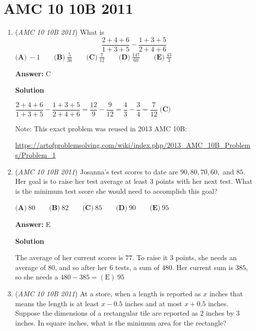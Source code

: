 \section{AMC 10 10B 2011}
        \begin{enumerate}
        	\item (\textit{AMC 10 10B 2011}) What is 
 \[\dfrac{2+4+6}{1+3+5} - \dfrac{1+3+5}{2+4+6}\]
$\textbf{(A)}\ -1\qquad\textbf{(B)}\ \frac{5}{36}\qquad\textbf{(C)}\ \frac{7}{12}\qquad\textbf{(D)}\ \frac{147}{60}\qquad\textbf{(E)}\ \frac{43}{3}$

 \textbf{Answer: }C



\textbf{Solution}

$\dfrac{2+4+6}{1+3+5} - \dfrac{1+3+5}{2+4+6} = \dfrac{12}{9} - \dfrac{9}{12} = \dfrac{4}{3} - \dfrac{3}{4} = \boxed{\dfrac{7}{12}\; \textbf{(C)}}$

 
Note: This exact problem was reused in 2013 AMC 10B: 

 \href{https://artofproblemsolving.com/wiki/index.php/2013\_AMC\_10B\_Problems/Problem\_1}{https://artofproblemsolving.com/wiki/index.php/2013\_AMC\_10B\_Problems/Problem\_1}

 


	\item (\textit{AMC 10 10B 2011}) Josanna's test scores to date are $90, 80, 70, 60,$ and $85$. Her goal is to raise her test average at least $3$ points with her next test. What is the minimum test score she would need to accomplish this goal?


 $\textbf{(A)}\ 80 \qquad\textbf{(B)}\ 82 \qquad\textbf{(C)}\ 85 \qquad\textbf{(D)}\ 90 \qquad\textbf{(E)}\ 95$

 \textbf{Answer: }E



\textbf{Solution}

The average of her current scores is $77$. To raise it $3$ points, she needs an average of $80$, and so after her $6$ tests, a sum of $480$. Her current sum is $385$, so she needs a $480 - 385 = \boxed{\mathrm{(E) \ } 95}$



	\item (\textit{AMC 10 10B 2011}) At a store, when a length is reported as $x$ inches that means the length is at least $x - 0.5$ inches and at most $x + 0.5$ inches. Suppose the dimensions of a rectangular tile are reported as $2$ inches by $3$ inches. In square inches, what is the minimum area for the rectangle?



\end{enumerate}

